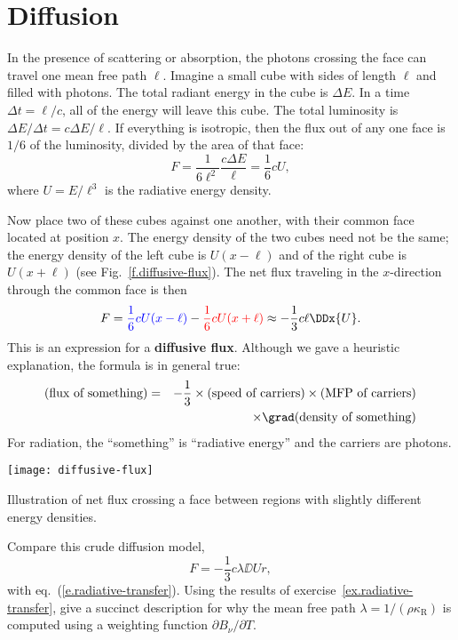 \section{Diffusion}\label{s.diffusion}

In the presence of scattering or absorption, the photons crossing the face can travel one mean free path $\ell$. Imagine a small cube with sides of length $\ell$ and filled with photons. The total radiant energy in the cube is $\Delta E$. In a time $\Delta t = \ell/c$, all of the energy will leave this cube. The total luminosity is $\Delta E/\Delta t = c\Delta E/\ell$. If everything is isotropic, then the flux out of any one face is $1/6$ of the luminosity, divided by the area of that face:
\[
	F = \frac{1}{6\ell^{2}}\frac{c\Delta E}{\ell} = \frac{1}{6}c U,
\]
where $U = E/\ell^{3}$ is the radiative energy density. 

Now place two of these cubes against one another, with their common face located at position $x$. The energy density of the two cubes need not be the same; the energy density of the left cube is $U(x-\ell)$ and of the right cube is $U(x+\ell)$ (see Fig.~\ref{f.diffusive-flux}). The net flux traveling in the $x$-direction through the common face is then
\[
	F = {\color{blue}\frac{1}{6} c U(x-\ell)} - {\color{red}\frac{1}{6} c U(x+\ell)} \approx -\frac{1}{3}c\ell \DDx{U}.
\]
This is an expression for a \textbf{diffusive flux}. Although we gave a heuristic explanation, the formula is in general true:
\begin{eqnarray}
\nonumber
(\textrm{flux of something}) &=& -\frac{1}{3}\times(\textrm{speed of carriers})\times(\textrm{MFP of carriers})\\
&&\times \grad(\textrm{density of something})
\label{e.diffusive-flux}
\end{eqnarray}
For radiation, the ``something'' is ``radiative energy'' and the carriers are photons.
\begin{marginfigure}[-12\baselineskip]
\texttt{[image: diffusive-flux]}
\caption{\label{f.diffusive-flux} Illustration of net flux crossing a face between regions with slightly different energy densities.}
\end{marginfigure}

\begin{exercisebox}
Compare this crude diffusion model,
\[
	F = -\frac{1}{3}c\lambda\DD{U}{r},
\]
with eq.~(\ref{e.radiative-transfer}). Using the results of exercise~\ref{ex.radiative-transfer}, give a succinct description for why the mean free path $\lambda = 1/(\rho\kappa_{\mathrm{R}})$ is computed using a weighting function $\partial B_{\nu}/\partial T$.
\end{exercisebox}

